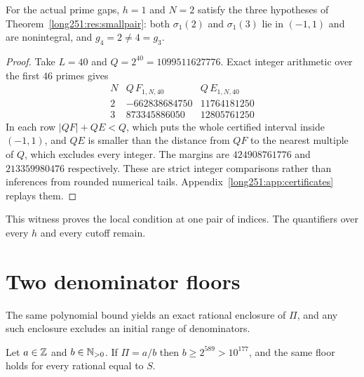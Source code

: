 \documentclass[11pt]{article}
\begin{document}
\begin{proposition}\label{long251:res:finite-smallpair}
For the actual prime gaps, $h=1$ and $N=2$ satisfy the three hypotheses of
Theorem~\ref{long251:res:smallpair}: both $\sigma_1(2)$ and $\sigma_1(3)$ lie in
$(-1,1)$ and are nonintegral, and $g_4=2\ne4=g_3$.
\end{proposition}

\begin{proof}
Take $L=40$ and $Q=2^{40}=1099511627776$.  Exact integer arithmetic over the
first $46$ primes gives
\[
\begin{array}{c|r|r}
 N&Q\,F_{1,N,40}&Q\,E_{1,N,40}\\\hline
 2&-662838684750&11764181250\\
 3& 873345886050&12805761250
\end{array}
\]
In each row $|QF|+QE<Q$, which puts the whole certified interval inside
$(-1,1)$, and $QE$ is smaller than the distance from $QF$ to the nearest
multiple of $Q$, which excludes every integer.  The margins are $424908761776$
and $213359980476$ respectively.  These are strict integer comparisons rather
than inferences from rounded numerical tails.
Appendix~\ref{long251:app:certificates} replays them.
\end{proof}

This witness proves the local condition at one pair of indices.  The
quantifiers over every $h$ and every cutoff remain.

\section{Two denominator floors}\label{long251:sec:denominator-floor}

The same polynomial bound yields an exact rational enclosure of $\Pi$, and any
such enclosure excludes an initial range of denominators.

\begin{theorem}\label{long251:res:denominatorfloor}
Let $a\in\mathbb{Z}$ and $b\in\mathbb{N}_{>0}$.  If $\Pi=a/b$ then $b\ge2^{589}>10^{177}$, and
the same floor holds for every rational equal to $S$.
\end{theorem}
\end{document}
